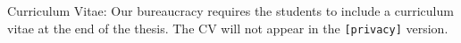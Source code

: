 \chapter*{\cvtitle}

Curriculum Vitae: Our bureaucracy requires the students to include a
curriculum vitae at the end of the thesis. The CV will not appear in
the \verb+[privacy]+ version.

